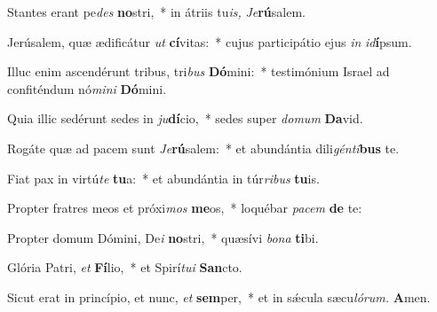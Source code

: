 \item Stantes erant pe\hspace*{0.02em}\textit{des} \textbf{no}stri,~* in átriis tu\textit{is,}\hspace*{0.02em} \textit{Je}\textbf{rú}salem.
\item Jerúsalem, quæ ædificátur \textit{ut} \textbf{cí}vitas:~* cujus participátio ejus \textit{in} \textit{id}\textbf{í}psum.
\item Illuc enim ascendérunt tribus, tri\textit{bus} \textbf{Dó}mini:~* testimónium Israel ad confiténdum nó\textit{mini} \textbf{Dó}mini.
\item Quia illic sedérunt sedes in \textit{ju}\textbf{dí}cio,~* sedes super \textit{domum} \textbf{Da}vid.
\item Rogáte quæ ad pacem sunt\hspace*{0.02em} \textit{Je}\textbf{rú}salem:~* et abundántia dili\textit{génti}\textbf{bus} te.
\item Fiat pax in virtú\textit{te} \textbf{tu}a:~* et abundántia in túr\textit{ribus} \textbf{tu}is.
\item Propter fratres meos et próxi\textit{mos} \textbf{me}os,~* loquébar \textit{pacem} \textbf{de} te:
\item Propter domum Dómini, De\textit{i} \textbf{no}stri,~* quæsívi \textit{bona} \textbf{ti}bi.
\item Glória Patri, \textit{et} \textbf{Fí}lio,~* et Spirí\tinyhspace\textit{tui} \textbf{San}cto.
\item Sicut erat in princípio, et nunc, \textit{et} \textbf{sem}per,~* et in sǽcula sæcu\tinyhspace\textit{lórum.} \textbf{A}men.